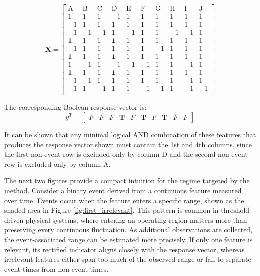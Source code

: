 \begingroup
\footnotesize
\setlength{\arraycolsep}{3pt}
\begin{equation}\label{eq:rq1-toy-rectified-feature-matrix}
\mathbf{X} =
\left[ \begin{array}{rrrrrrrrrr}
	\text{A} & \text{B} & \text{C} & \text{D} & \text{E} & \text{F} & \text{G} & \text{H} & \text{I} & \text{J} \\
	1 &  1 &  1 & -1 &  1 &  1 &  1 &  1 &  1 &  1 \\
	-1 &  1 &  1 &  1 &  1 &  1 &  1 &  1 &  1 &  1 \\
	-1 & -1 & -1 &  1 & -1 &  1 &  1 & -1 & -1 &  1 \\ 
	\mathbf{1} &  1 &  1 &  \mathbf{1} & 1 & 1 & 1 & 1 & 1 &  1 \\
	-1 &  1 &  1 &  1 &  1 &  1 & -1 &  1 &  1 &  1 \\
	\mathbf{1} &  1 &  1 & \mathbf{1} & 1 & 1 & 1 & 1 & 1 & 1 \\
	1 & -1 &  1 & -1 & -1 & -1 &  1 &  1 & -1 &  1 \\
	\mathbf{1} &  1 &  1 & \mathbf{1} & 1 & 1 &  1 & 1 &  1 &  1 \\
	-1 & -1 &  1 &  1 &  1 &  1 &  1 &  1 & -1 &  1 \\
	-1 &  1 & -1 &  1 &  1 & -1 & -1 &  1 & -1 & -1 \\
\end{array} \right]
\end{equation}
\endgroup

The corresponding Boolean response vector is:
\begin{equation}\label{eq:rq1-toy-response-vector}
y^T = 
\begin{bmatrix}
	F & F & F & \mathbf{T} & F & \mathbf{T} & F & \mathbf{T} & F & F
\end{bmatrix} 
\end{equation}

It can be shown that any minimal logical AND combination of these features that produces the response vector shown must contain the 1st and 4th columns, since the first non-event row is excluded only by column D and the second non-event row is excluded only by column A.  %

The next two figures provide a compact intuition for the regime targeted by the method. Consider a binary event derived from a continuous feature measured over time. Events occur when the feature enters a specific range, shown as the shaded area in Figure \ref{fig:first_irrelevant}. This pattern is common in threshold-driven physical systems, where entering an operating region matters more than preserving every continuous fluctuation. As additional observations are collected, the event-associated range can be estimated more precisely. If only one feature is relevant, its rectified indicator aligns closely with the response vector, whereas irrelevant features either span too much of the observed range or fail to separate event times from non-event times.


